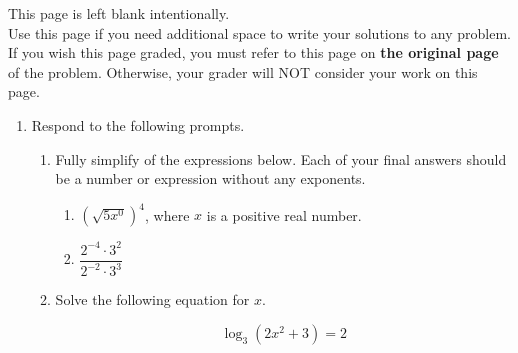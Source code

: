 \documentclass[11pt]{article}
\begin{document}
{    }

\vfill


\newpage

This page is left blank intentionally.\\

Use this page if you need additional space to write your solutions to any problem. \\

If you wish this page graded, you must refer to this page on \textbf{the original page} of the problem. Otherwise, your grader will NOT consider your work on this page.

\newpage%


\begin{enumerate}



\item Respond to the following prompts. 

\begin{enumerate}
    \item Fully simplify of the expressions below. Each of your final answers should be a number or expression without any exponents.

    \begin{enumerate}
        \item[(i)] $(\sqrt{5x^0})^{4}$, where $x$ is a positive real number. 

        \vfill

        \item[(ii)] $\dfrac{2^{-4}\cdot3^2}{2^{-2}\cdot3^3}$
    \end{enumerate}

    \vfill

    \item Solve the following equation for $x$. 

    \[\log_3(2x^2+3)=2\]

    \vfill
\end{enumerate}




\end{enumerate}
\end{document}
